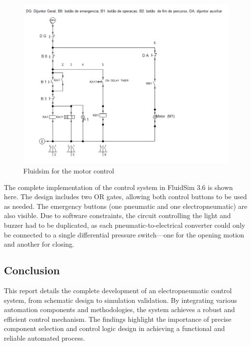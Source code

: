 \begin{figure}[H]
    \includegraphics[width=16cm]{Images/Q2/fluidsim.png}
    \centering
    \caption{Fluidsim for the motor control}
    \label{fig:fluidsim}
\end{figure}

The complete implementation of the control system in FluidSim 3.6 is shown here. The design includes two OR gates, 
allowing both control buttons to be used as needed. The emergency buttons (one pneumatic and one electropneumatic) 
are also visible. Due to software constraints, the circuit controlling the light and buzzer had to be duplicated, as 
each pneumatic-to-electrical converter could only be connected to a single differential pressure switch—one for the 
opening motion and another for closing.\\

\subsection{Conclusion}

This report details the complete development of an electropneumatic control system, from schematic 
design to simulation validation. By integrating various automation components and methodologies, 
the system achieves a robust and efficient control mechanism. The findings highlight the importance 
of precise component selection and control logic design in achieving a functional and reliable 
automated process.